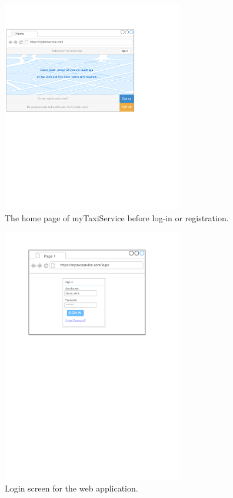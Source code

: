 \begin{figure}[h]
\centering
\includegraphics[width=0.7\textwidth]{mockup/web/GuestHome}
\caption{The home page of myTaxiService before log-in or registration.}
\label{fig:mockup-guesthome}
\end{figure}

\begin{figure}[h]
\centering
\includegraphics[width=0.7\textwidth]{mockup/web/Login_browser}
\caption{Login screen for the web application.}
\label{fig:mockup-login-browser}
\end{figure}


